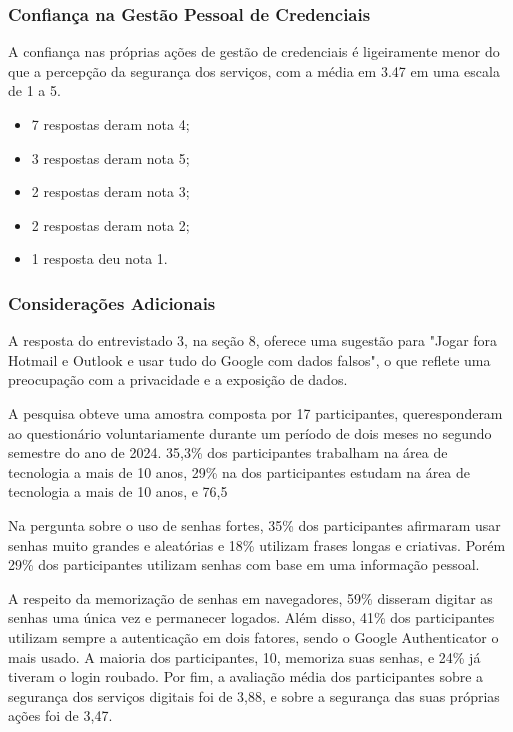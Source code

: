 \documentclass[12pt]{article}
\begin{document}
\subsubsection{Confiança na Gestão Pessoal de Credenciais}

A confiança nas próprias ações de gestão de credenciais é ligeiramente menor do que a
percepção da segurança dos serviços, com a média em 3.47 em uma escala de 1 a 5.

\begin{itemize}
  \item 7 respostas deram nota 4;
  \item 3 respostas deram nota 5;
  \item 2 respostas deram nota 3;
  \item 2 respostas deram nota 2;
  \item 1 resposta deu nota 1.
\end{itemize}

\subsubsection{Considerações Adicionais}

A resposta do entrevistado 3, na seção 8, oferece uma sugestão para "Jogar fora Hotmail
e Outlook e usar tudo do Google com dados falsos", o que reflete uma preocupação com a
privacidade e a exposição de dados.








A pesquisa obteve uma amostra composta por 17 participantes, queresponderam
ao questionário voluntariamente durante um período de dois meses no segundo
semestre do ano de 2024.
35,3\% dos participantes trabalham na área de tecnologia a mais de 10 anos,
29\% na dos participantes estudam na área de tecnologia a mais de 10 anos,
e 76,5%

Na pergunta sobre o uso de senhas fortes, 35\% dos participantes afirmaram
usar senhas muito grandes e aleatórias e 18\% utilizam frases longas
e criativas. Porém 29\% dos participantes utilizam senhas com base em uma
informação pessoal.

A respeito da memorização de senhas em navegadores, 59\% disseram digitar as
senhas uma única vez e permanecer logados.
Além disso, 41\% dos participantes utilizam sempre a autenticação em dois
fatores, sendo o Google Authenticator o mais usado.
A maioria dos participantes, 10, memoriza suas senhas, e 24\% já tiveram o
login roubado.
Por fim, a avaliação média dos participantes sobre a segurança dos serviços
digitais foi de 3,88, e sobre a segurança das suas próprias ações foi de
3,47.
\end{document}
